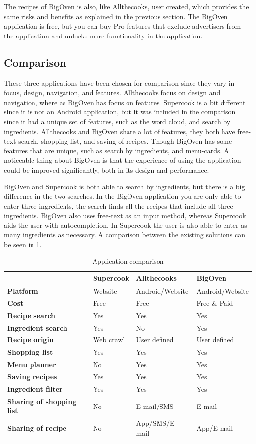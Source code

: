 The recipes of BigOven is also, like Allthecooks, user created, which provides the same risks and benefits as explained in the previous section.
The BigOven application is free, but you can buy Pro-features that exclude advertisers from the application and unlocks more functionality in the application.

\subsection{Comparison}
These three applications have been chosen for comparison since they vary in focus, design, navigation, and features. Allthecooks focus on design and navigation, where as BigOven has focus on features. Supercook is a bit different since it is not an Android application, but it was included in the comparison since it had a unique set of features, such as the word cloud, and search by ingredients.
Allthecooks and BigOven share a lot of features, they both have free-text search, shopping list, and saving of recipes. Though BigOven has some features that are unique, such as search by ingredients, and menu-cards. A noticeable thing about BigOven is that the experience of using the application could be improved significantly, both in its design and performance.

BigOven and Supercook is both able to search by ingredients, but there is a big difference in the two searches. In the BigOven application you are only able to enter three ingredients, the search finds all the recipes that include all three ingredients. BigOven also uses free-text as an input method, whereas Supercook aids the user with autocompletion. In Supercook the user is also able to enter as many ingredients as necessary.
A comparison between the existing solutions can be seen in \ref{tab:appcomparison}.
\begin{table}[H]
\centering
\begin{tabular}{|>{\bfseries}l|l|l|l|}
\hline
 & \textbf{Supercook} & \textbf{Allthecooks} & \textbf{BigOven} \\
\hline
Platform & Website & Android/Website & Android/Website \\
\hline
Cost & Free & Free & Free \& Paid \\
\hline
Recipe search & Yes & Yes & Yes  \\
\hline
Ingredient search & Yes & No & Yes \\
\hline
Recipe origin & Web crawl & User defined & User defined \\
\hline
Shopping list & Yes & Yes & Yes \\
\hline
Menu planner & No & Yes & Yes \\
\hline
Saving recipes & Yes & Yes & Yes \\
\hline
Ingredient filter & Yes & Yes & Yes \\
\hline
Sharing of shopping list & No & E-mail/SMS & E-mail \\
\hline
Sharing of recipe & No & App/SMS/E-mail & App/E-mail \\
\hline
\end{tabular}
\caption{Application comparison}
\label{tab:appcomparison}
\end{table}

